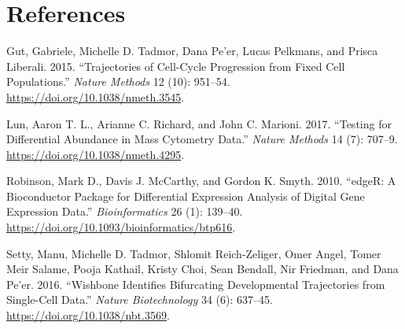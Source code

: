 \documentclass[
]{article}
\newlength{\cslhangindent}
\newenvironment{cslreferences}%
  {\setlength{\parindent}{0pt}%
  \everypar{\setlength{\hangindent}{\cslhangindent}}\ignorespaces}%
  {\par}
\begin{document}
\hypertarget{references}{%
\section*{References}\label{references}}

\hypertarget{refs}{}
\begin{cslreferences}
\leavevmode\hypertarget{ref-gutTrajectoriesCellcycleProgression2015}{}%
Gut, Gabriele, Michelle D. Tadmor, Dana Pe'er, Lucas Pelkmans, and
Prisca Liberali. 2015. ``Trajectories of Cell-Cycle Progression from
Fixed Cell Populations.'' \emph{Nature Methods} 12 (10): 951--54.
\url{https://doi.org/10.1038/nmeth.3545}.

\leavevmode\hypertarget{ref-lunTestingDifferentialAbundance2017}{}%
Lun, Aaron T. L., Arianne C. Richard, and John C. Marioni. 2017.
``Testing for Differential Abundance in Mass Cytometry Data.''
\emph{Nature Methods} 14 (7): 707--9.
\url{https://doi.org/10.1038/nmeth.4295}.

\leavevmode\hypertarget{ref-robinsonEdgeRBioconductorPackage2010a}{}%
Robinson, Mark D., Davis J. McCarthy, and Gordon K. Smyth. 2010.
``edgeR: A Bioconductor Package for Differential Expression Analysis of
Digital Gene Expression Data.'' \emph{Bioinformatics} 26 (1): 139--40.
\url{https://doi.org/10.1093/bioinformatics/btp616}.

\leavevmode\hypertarget{ref-settyWishboneIdentifiesBifurcating2016}{}%
Setty, Manu, Michelle D. Tadmor, Shlomit Reich-Zeliger, Omer Angel,
Tomer Meir Salame, Pooja Kathail, Kristy Choi, Sean Bendall, Nir
Friedman, and Dana Pe'er. 2016. ``Wishbone Identifies Bifurcating
Developmental Trajectories from Single-Cell Data.'' \emph{Nature
Biotechnology} 34 (6): 637--45. \url{https://doi.org/10.1038/nbt.3569}.
\end{cslreferences}
\end{document}
